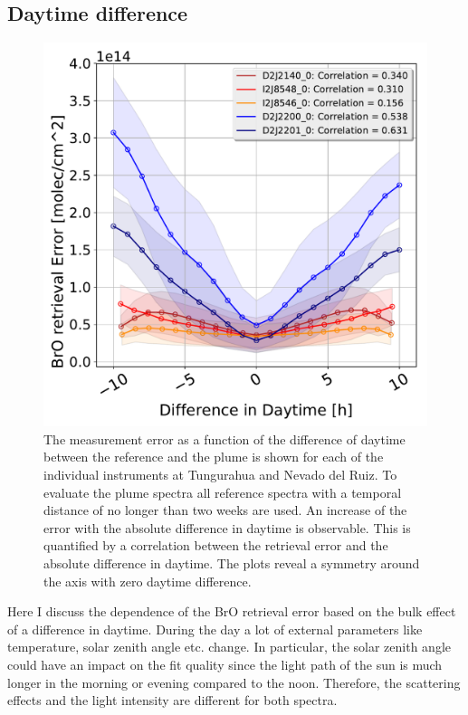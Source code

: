 \subsection{ Daytime difference \label{chap:daytime}}
\begin{figure}[h!]
    \centering
    \includegraphics[width=0.7\linewidth]{Bilder/DiffDaytimeallInstruments}
    \caption[The  measurement error as a function of the difference of daytime between the reference and the plume is shown for each of the individual instruments at Tungurahua and Nevado del Ruiz.]{The  measurement error as a function of the difference of daytime between the reference and the plume is shown for each of the individual instruments at Tungurahua and Nevado del Ruiz. To evaluate the plume spectra all reference spectra with a temporal distance of no longer than two weeks are used. An increase of the  error with the absolute difference in daytime is observable. This is quantified by a correlation between the  retrieval error and the absolute difference in daytime. The plots reveal a symmetry around the axis with zero daytime difference. }
    \label{fig:diffdaytime}
\end{figure}
Here I discuss the dependence of the BrO retrieval error based on the bulk effect of a difference in daytime. During the day a lot of external parameters like temperature, solar zenith angle etc. change. In particular, the solar zenith angle could have an impact on the fit quality since the light path of the sun is much longer in the morning or evening compared to the noon. Therefore, the scattering effects and the light intensity are different for both spectra.\\

